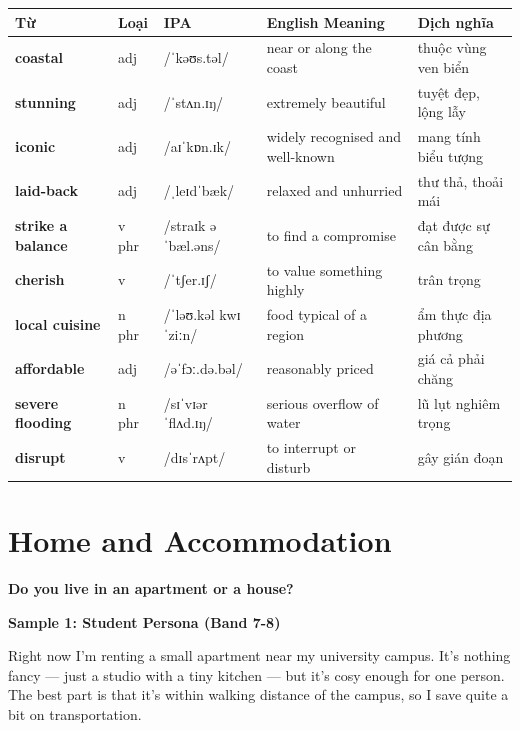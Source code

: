 \vspace{0.8em}
\begin{center}
\renewcommand{\arraystretch}{1.65}
\begin{tabularx}{\textwidth}{|V{0.22\textwidth}|C{0.07\textwidth}|I{0.20\textwidth}|Y|V{0.18\textwidth}|}
\hline
{}
\textbf{Từ} & \textbf{Loại} & \textbf{IPA} & \textbf{English Meaning} & \textbf{Dịch nghĩa} \\
\hline
\textbf{coastal} & adj & /ˈkəʊs.təl/ & near or along the coast & thuộc vùng ven biển \\ \hline
\textbf{stunning} & adj & /ˈstʌn.ɪŋ/ & extremely beautiful & tuyệt đẹp, lộng lẫy \\ \hline
\textbf{iconic} & adj & /aɪˈkɒn.ɪk/ & widely recognised and well-known & mang tính biểu tượng \\ \hline
\textbf{laid-back} & adj & /ˌleɪdˈbæk/ & relaxed and unhurried & thư thả, thoải mái \\ \hline
\textbf{strike a balance} & v phr & /straɪk ə ˈbæl.əns/ & to find a compromise & đạt được sự cân bằng \\ \hline
\textbf{cherish} & v & /ˈtʃer.ɪʃ/ & to value something highly & trân trọng \\ \hline
\textbf{local cuisine} & n phr & /ˈləʊ.kəl kwɪˈziːn/ & food typical of a region & ẩm thực địa phương \\ \hline
\textbf{affordable} & adj & /əˈfɔː.də.bəl/ & reasonably priced & giá cả phải chăng \\ \hline
\textbf{severe flooding} & n phr & /sɪˈvɪər ˈflʌd.ɪŋ/ & serious overflow of water & lũ lụt nghiêm trọng \\ \hline
\textbf{disrupt} & v & /dɪsˈrʌpt/ & to interrupt or disturb & gây gián đoạn \\ \hline
\end{tabularx}
\end{center}

\newpage

\section{Home and Accommodation}
\begin{ieltsquestion}
\textbf{Do you live in an apartment or a house?}
\end{ieltsquestion}
\textbf{Sample 1: Student Persona (Band 7-8)}

Right now I'm renting a small apartment near my university campus. It's nothing fancy — just a studio with a tiny kitchen — but it's cosy enough for one person. The best part is that it's within walking distance of the campus, so I save quite a bit on transportation.

